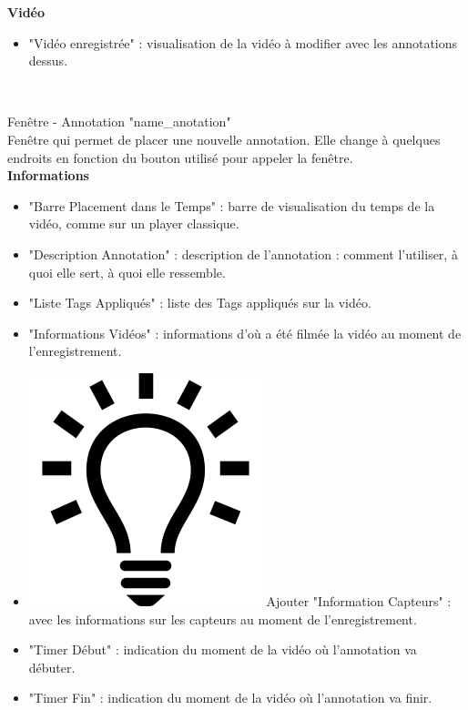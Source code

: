\documentclass[11pt,french,a4paper]{report}
\begin{document}
\large \textbf{Vidéo}\normalsize
    \begin{itemize}[label=, leftmargin=*,parsep=0cm,itemsep=0cm,topsep=0cm]
        \item "Vidéo enregistrée" : visualisation de la vidéo à modifier avec les annotations dessus.
    \end{itemize}

\dotfill \\
\clearpage

\Large Fenêtre - Annotation "name\_anotation"\normalsize \\
    Fenêtre qui permet de placer une nouvelle annotation. Elle change à quelques endroits en fonction
    du bouton utilisé pour appeler la fenêtre. \\
\large \textbf{Informations}\normalsize
    \begin{itemize}[label=, leftmargin=*,parsep=0cm,itemsep=0cm,topsep=0cm]
        \item "Barre Placement dans le Temps" : barre de visualisation du temps de la vidéo, comme sur un player classique.
        \item "Description Annotation" : description de l'annotation : comment l'utiliser, à quoi elle sert, à quoi elle ressemble.
        \item "Liste Tags Appliqués" : liste des Tags appliqués sur la vidéo.
        \item "Informations Vidéos" : informations d'où a été filmée la vidéo au moment de l'enregistrement.
        \item \includegraphics[scale=0.05]{../images/logo/logo_ampoule} Ajouter "Information Capteurs" :
            avec les informations sur les capteurs au moment de l'enregistrement. 
        \item "Timer Début" : indication du moment de la vidéo où l'annotation va débuter.
        \item "Timer Fin" : indication du moment de la vidéo où l'annotation va finir.
    \end{itemize}
\end{document}

